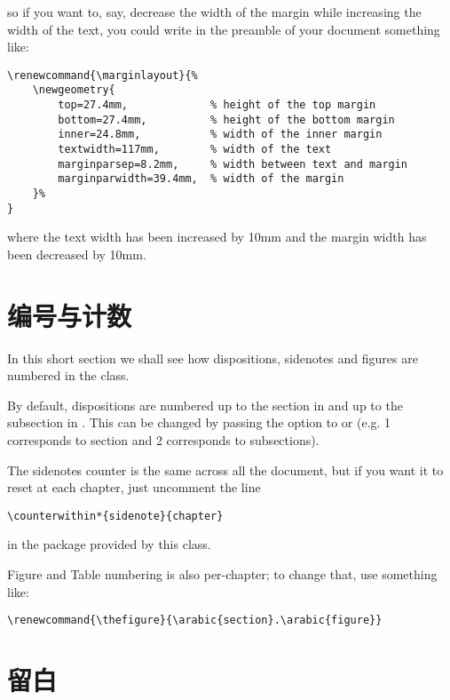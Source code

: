 so if you want to, say, decrease the width of the margin while
increasing the width of the text, you could write in the preamble of
your document something like:

\begin{lstlisting}
\renewcommand{\marginlayout}{%
	\newgeometry{
		top=27.4mm,				% height of the top margin
		bottom=27.4mm,			% height of the bottom margin
		inner=24.8mm,			% width of the inner margin
		textwidth=117mm,		% width of the text
		marginparsep=8.2mm,		% width between text and margin
		marginparwidth=39.4mm,	% width of the margin
	}%
}
\end{lstlisting}

where the text width has been increased by 10mm and the margin width has
been decreased by 10mm.

\section{编号与计数}

In this short section we shall see how dispositions, sidenotes and
figures are numbered in the  class.

By default, dispositions are numbered up to the section in 
and up to the subsection in . This can be changed by
passing the option  to or
 (e.g. 1 corresponds to section and 2 corresponds to
subsections).

The sidenotes counter is the same across all the document, but if you
want it to reset at each chapter, just uncomment the line

\begin{lstlisting}[style=kaolstplain]
\counterwithin*{sidenote}{chapter}
\end{lstlisting}

in the  package provided by this class.

Figure and Table numbering is also per-chapter; to change that, use
something like:

\begin{lstlisting}[style=kaolstplain]
\renewcommand{\thefigure}{\arabic{section}.\arabic{figure}}
\end{lstlisting}

\section{留白}

